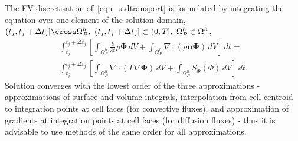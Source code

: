 The FV discretisation of~\ref{eqn_stdtransport} is formulated by integrating the equation over one element of the solution domain,
 $(t_{j}, t_{j} + \Delta t_{j}] \cross \Omega_{P}^{h}, \,\,(t_{j}, t_{j} + \Delta t_{j}] \subset (0,T], \,\, \Omega_{P}^{h} \in \Omega^{h}$,
 \begin{multline}\label{eqn_fvdiscstdtransport}
    \int_{t_{j}}^{t_{j} + \Delta t_{j}} \left[
        \int_{\Omega_{P}^{h}}\frac{\partial}{\partial t} \rho \mathbf{\Phi}\,dV + \int_{\Omega_{P}^{h}}\nabla \cdot (\rho \mathbf{u} \mathbf{\Phi})\,dV
    \right]\,dt =\\
    \int_{t_{j}}^{t_{j} + \Delta t_{j}} \left[
        \int_{\Omega_{P}^{h}}\nabla \cdot (\Gamma \nabla \mathbf{\Phi})\,dV + \int_{\Omega_{P}^{h}}S_{\Phi}(\Phi)\,dV
    \right]\,dt.
\end{multline}
Solution converges with the lowest order of the three approximations - approximations of surface and volume integrals, interpolation from cell centroid to integration points at cell
faces (for convective fluxes), and approximation of gradients at integration points at cell faces (for diffusion fluxes) - thus it is advisable to use methods
of the same order for all approximations.
